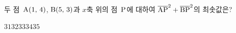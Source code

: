 두 점~$\mathrm{A}(1,\,4)$, $\mathrm{B}(5,\,3)$과 $x$축 위의 점~$\mathrm{P}$에 대하여 $\overline{\mathrm{AP}}^2+\overline{\mathrm{BP}}^2$의 최솟값은?
\begin{choices32}{$31$}{$32$}{$33$}{$34$}{$35$}\end{choices32}
